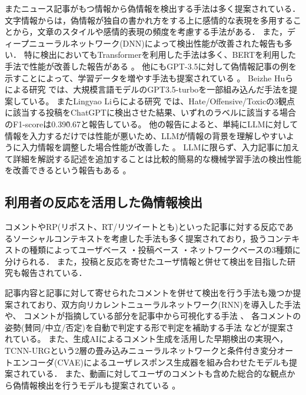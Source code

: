 またニュース記事がもつ情報から偽情報を検出する手法は多く提案されている．
文字情報からは，偽情報が独自の書かれ方をする上に感情的な表現を多用することから，文章のスタイル\cite{potthast-etal-2018-stylometric}や感情的表現の頻度\cite{DBLP:journals/corr/abs-1903-01728}を考慮する手法がある．
また，ディープニューラルネットワーク(DNN)によって検出性能が改善された報告\cite{wang-2017-liar,karimi-tang-2019-learning,karimi-etal-2018-multi}も多い．
特に検出においてもTransformerを利用した手法は多く、BERTを利用した手法で性能が改善した報告がある \cite{Kaliyar2021,yanagi2021classifying}。
他にもGPT-3.5に対して偽情報記事の例を示すことによって、学習データを増やす手法も提案されている \cite{lucas-etal-2023-fighting}。
Beizhe Huらによる研究 \cite{Hu_Sheng_Cao_Shi_Li_Wang_Qi_2024}では、大規模言語モデルのGPT3.5-turboを一部組み込んだ手法を提案している。
またLingyao Liらによる研究 \cite{10.1145/3643829}では、Hate/Offensive/Toxicの3観点に該当する投稿をChatGPTに検出させた結果、いずれのラベルに該当する場合のF1-scoreは0.39\~0.67と報告している。
他の報告によると、単純にLLMに対して情報を入力するだけでは性能が悪いため、LLMが情報の背景を理解しやすいように入力情報を調整した場合性能が改善した \cite{doi:10.1137/1.9781611978032.50}。
LLMに限らず、入力記事に加えて詳細を解説する記述を追加することは比較的簡易的な機械学習手法の検出性能を改善できるという報告もある \cite{Bonet-Jover2024}。

\subsection{利用者の反応を活用した偽情報検出}
コメントやRP(リポスト、RT/リツイートとも)といった記事に対する反応であるソーシャルコンテキストを考慮した手法も多く提案されており，扱うコンテキストの種類によってユーザベース\cite{Castillo:2011:ICT:1963405.1963500,8397048,DBLP:journals/corr/abs-1904-13355}
・投稿ベース\cite{Yang_Shu_Wang_Gu_Wu_Liu_2019,Tacchini2017SomeLI,Jin:2016:NVE:3016100.3016318}
・ネットワークベース\cite{Wu:2018:TFF:3159652.3159677,DBLP:journals/corr/abs-1902-06673}の3種類に分けられる．
また，投稿と反応を寄せたユーザ情報と併せて検出を目指した研究も報告されている\cite{10.1145/3386253}．

記事内容と記事に対して寄せられたコメントを併せて検出を行う手法も幾つか提案されており、双方向リカレントニューラルネットワーク(RNN)を導入した手法や\cite{https://doi.org/10.1049/ise2.12021}、
コメントが指摘している部分を記事中から可視化する手法 \cite{10.1145/3292500.3330935}、
各コメントの姿勢(賛同/中立/否定)を自動で判定する形で判定を補助する手法 \cite{9414787} などが提案されている。
また、生成AIによるコメント生成を活用した早期検出の実現へ，TCNN-URGという2層の畳み込みニューラルネットワークと条件付き変分オートエンコーダ(CVAE)によるユーザレスポンス生成器を組み合わせたモデルも提案されている\cite{ijcai2018-533}．
また、動画に対してユーザのコメントも含めた総合的な観点から偽情報検出を行うモデルも提案されている \cite{zong-etal-2024-unveiling}。

